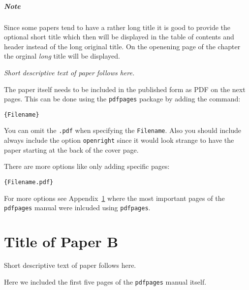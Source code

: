 \documentclass[%
norsk,     %
]{USN-BSc}
\begin{document}
\paragraph{Note}
Since some papers tend to have a rather long title it is good to provide the optional short title which then will be displayed in the table of contents and header instead of the long original title.
On the openening page of the chapter the orginal \emph{long} title will be displayed.\bigskip

\emph{Short descriptive text of paper follows here.}\bigskip

The paper itself needs to be included in the published form as PDF on the next pages.
This can be done using the \texttt{pdfpages} package by adding the command:

\begin{verbatim}
{Filename}
\end{verbatim}

You can omit the \texttt{.pdf} when specifying the \texttt{Filename}. Also you should include always include the option \texttt{openright} since it would look strange to have the paper starting at the back of the cover page.

There are more options like only adding specific pages:
\begin{verbatim}
{Filename.pdf}
\end{verbatim}

For more options see Appendix~\ref{paper-b} where the most important pages of the \texttt{pdfpages} manual were inlcuded using \texttt{pdfpages}.




\chapter[Short Title of Paper B]{Title of Paper B}
\label{paper-b}
Short descriptive text of paper follows here.

Here we included the first five pages of the \texttt{pdfpages} manual itself.


\end{document}
